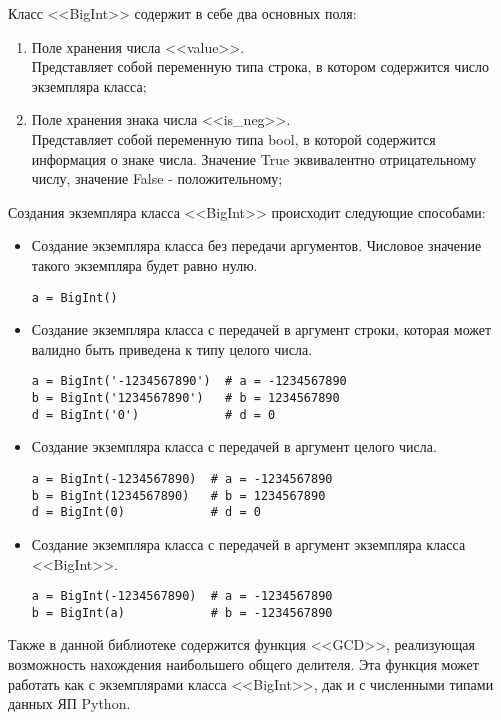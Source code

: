 Класс <<BigInt>> содержит в себе два основных поля:
\begin{enumerate}
    \item Поле хранения числа <<value>>.\\
    Представляет собой переменную типа строка, в котором содержится число экземпляра класса;
    \item Поле хранения знака числа <<is\_neg>>.\\
    Представляет собой переменную типа bool, в которой содержится информация о знаке числа.
    Значение True эквивалентно отрицательному числу, значение False - положительному;
\end{enumerate}

Создания экземпляра класса <<BigInt>> происходит следующие способами:
\begin{itemize}
    \item Создание экземпляра класса без передачи аргументов. Числовое значение такого экземпляра будет равно нулю.
    \begin{lstlisting}
a = BigInt()
    \end{lstlisting}
    \item Создание экземпляра класса с передачей в аргумент строки, которая может валидно быть приведена к типу целого числа.
    \begin{lstlisting}
a = BigInt('-1234567890')  # a = -1234567890
b = BigInt('1234567890')   # b = 1234567890
d = BigInt('0')            # d = 0
    \end{lstlisting}
    \item Создание экземпляра класса с передачей в аргумент целого числа.
    \begin{lstlisting}
a = BigInt(-1234567890)  # a = -1234567890
b = BigInt(1234567890)   # b = 1234567890
d = BigInt(0)            # d = 0
    \end{lstlisting}
    \item Создание экземпляра класса с передачей в аргумент экземпляра класса <<BigInt>>.
    \begin{lstlisting}
a = BigInt(-1234567890)  # a = -1234567890
b = BigInt(a)            # b = -1234567890
    \end{lstlisting}
\end{itemize}

Также в данной библиотеке содержится функция <<GCD>>, реализующая возможность нахождения наибольшего общего делителя.
Эта функция может работать как с экземплярами класса <<BigInt>>, дак и с численными типами данных ЯП Python.


